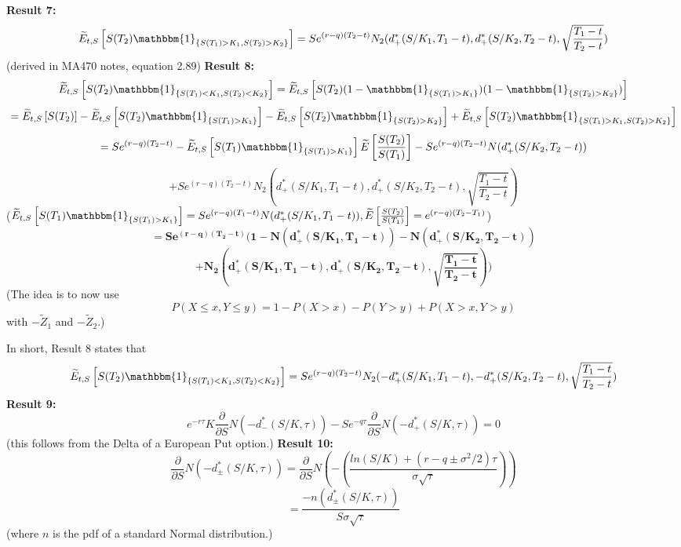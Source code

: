 \documentclass{article}[12pt,a4paper]
\begin{document}
     \noindent \textbf{Result 7:}
     $$\widetilde{E}_{t, S}\left[ S(T_2) \mathbbm{1}_{\{ S(T_1) > K_1, S(T_2) > K_2\}} \right]
     = Se^{(r - q)(T_2 - t)}N_2(d_+^*(S/K_1, T_1 - t), d_+^*(S/K_2,T_2 - t), \sqrt{\frac{T_1 - t}{T_2 - t}})$$
     \hfill (derived in MA470 notes, equation 2.89) \newline
     \textbf{Result 8:}
      $$\widetilde{E}_{t, S}\left[ S(T_2) \mathbbm{1}_{\{ S(T_1) < K_1, S(T_2) < K_2 \}} \right]
      = \widetilde{E}_{t, S}\left[ S(T_2) (1 -  \mathbbm{1}_{\{ S(T_1) > K_1\}})(1 -  \mathbbm{1}_{\{S(T_2) > K_2 \}}) 		
      \right]$$
      $$= \widetilde{E}_{t, S}\left[ S(T_2) \right] - 
      \widetilde{E}_{t, S}\left[ S(T_2) \mathbbm{1}_{\{ S(T_1) > K_1\}} \right] - 
      \widetilde{E}_{t, S}\left[ S(T_2) \mathbbm{1}_{\{S(T_2) > K_2 \}} \right] + 
      \widetilde{E}_{t, S}\left[ S(T_2) \mathbbm{1}_{\{ S(T_1) > K_1, S(T_2) > K_2\}} \right]$$
      $$= Se^{(r - q)(T_2 - t)} -  \widetilde{E}_{t, S}\left[S(T_1) \mathbbm{1}_{\{ S(T_1) > K_1\}} \right]
       \widetilde{E}\left[ \frac{S(T_2)}{S(T_1)} \right]
       - Se^{(r-q)(T_2 - t)}N(d_+^*(S/K_2, T_2 - t))$$ 
      $$+ Se^{(r - q)(T_2 - t)}N_2(d_+^*(S/K_1, T_1 - t), d_+^*(S/K_2,T_2 - t), \sqrt{\frac{T_1 - t}{T_2 - t}})$$
      \hfill ($\widetilde{E}_{t, S}\left[S(T_1) \mathbbm{1}_{\{ S(T_1) > K_1\}} \right] = 
      Se^{(r - q)(T_1 - t)}N(d_+^*(S/K_1, T_1 - t))
       ,\widetilde{E}\left[ \frac{S(T_2)}{S(T_1)} \right] = e^{(r - q)(T_2 - T_1)}$)
      $$= \mathbf{Se^{(r - q)(T_2 - t)}(1 - N(d_+^*(S/K_1, T_1 - t))- N(d_+^*(S/K_2, T_2 - t)) }$$
      $$\mathbf{ + N_2(d_+^*(S/K_1, T_1 - t), d_+^*(S/K_2,T_2 - t), \sqrt{\frac{T_1 - t}{T_2 - t}}))}$$ 
      (The idea is to now use
      $$P(X \le x, Y \le y) = 1 - P(X > x) - P(Y > y) + P(X > x, Y > y)$$
      with $-\widetilde{Z}_1$ and $-\widetilde{Z}_2$.) \newline
      
      \noindent In short, Result 8 states that 
      $$\widetilde{E}_{t, S}\left[ S(T_2) \mathbbm{1}_{\{ S(T_1) < K_1, S(T_2) < K_2 \}} \right]
      =Se^{(r - q)(T_2 - t)} N_2(-d_+^*(S/K_1, T_1 - t), -d_+^*(S/K_2,T_2 - t), \sqrt{\frac{T_1 - t}{T_2 - t}})$$ \newline
      \textbf{Result 9:}
      $$e^{-r\tau}K\frac{\partial}{\partial S} N(-d_-^*(S/K, \tau)) - 
      Se^{-q\tau}\frac{\partial}{\partial S} N(-d_+^*(S/K, \tau)) = 0$$
      \hfill (this follows from the Delta of a European Put option.) \newline
      \textbf{Result 10:}
      $$\frac{\partial}{\partial S}N(-d_\pm^*(S/K, \tau)) = \frac{\partial}{\partial S}
      N(-(\frac{ln(S/K) + (r - q \pm \sigma^2/2)\tau}{\sigma\sqrt\tau}))$$
     $$= \frac{- n(d_\pm^*(S/K, \tau))}{S \sigma \sqrt{\tau}}$$
     \hfill (where $n$ is the pdf of a standard Normal distribution.)
      
\end{document}
